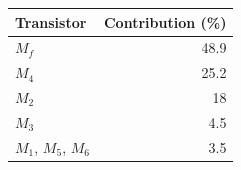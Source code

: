 \begin{tabular}{lr}
\toprule
Transistor & Contribution (\%) \\
\midrule
$M_f$ & 48.9 \\
$M_4$ & 25.2 \\
$M_2$ & 18 \\
$M_3$ & 4.5 \\
$M_1$, $M_5$, $M_6$ & 3.5 \\
\bottomrule
\end{tabular}
